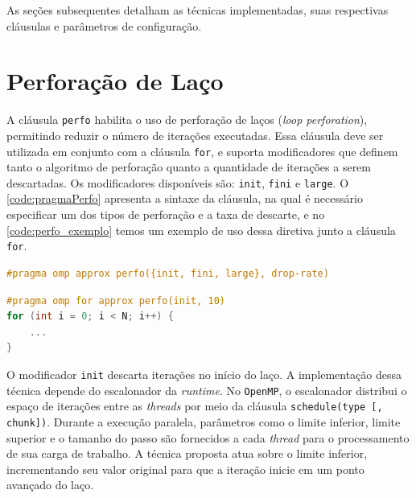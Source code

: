 As seções subsequentes detalham as técnicas implementadas, suas respectivas cláusulas e parâmetros de configuração.

\section{Perforação de Laço}\label{subsec:pragmaPerfo}

A cláusula \texttt{perfo} habilita o uso de perforação de laços (\textit{loop perforation}), permitindo reduzir o número de iterações executadas. Essa cláusula deve ser utilizada em conjunto com a cláusula \texttt{for}, e suporta modificadores que definem tanto o algoritmo de perforação quanto a quantidade de iterações a serem descartadas. Os modificadores disponíveis são: \texttt{init}, \texttt{fini} e \texttt{large}. O \autoref{code:pragmaPerfo} apresenta a sintaxe da cláusula, na qual é necessário especificar um dos tipos de perforação e a taxa de descarte, e no \autoref{code:perfo_exemplo} temos um exemplo de uso dessa diretiva junto a cláusula \texttt{for}.

\begin{sourcecode}[htb]
    \caption{Sintaxe da cláusula \texttt{perfo}.}
    \label{code:pragmaPerfo}
    \begin{lstlisting}[frame=single, language=C++]
#pragma omp approx perfo({init, fini, large}, drop-rate)
    \end{lstlisting}
    \fonte{}
\end{sourcecode}

\begin{sourcecode}[htb]
    \caption{Exemplo de uso da cláusula \texttt{perfo}.}
    \label{code:perfo_exemplo}
    \begin{lstlisting}[frame=single, language=C++]
#pragma omp for approx perfo(init, 10)
for (int i = 0; i < N; i++) {
    ...
}
    \end{lstlisting}
    \fonte{}
\end{sourcecode}

O modificador \texttt{init} descarta iterações no início do laço. A implementação dessa técnica depende do escalonador da \textit{runtime}. No \texttt{OpenMP}, o escalonador distribui o espaço de iterações entre as \textit{threads} por meio da cláusula \texttt{schedule(type [, chunk])}. Durante a execução paralela, parâmetros como o limite inferior, limite superior e o tamanho do passo são fornecidos a cada \textit{thread} para o processamento de sua carga de trabalho. A técnica proposta atua sobre o limite inferior, incrementando seu valor original para que a iteração inicie em um ponto avançado do laço.

